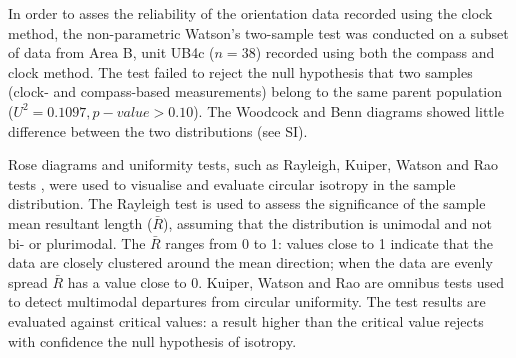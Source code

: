 \documentclass[preprint,authoryear,times]{elsarticle} %
\begin{document}
In order to asses the reliability of the orientation data recorded using the clock method, the non-parametric Watson's two-sample test was conducted on a subset of data from Area B, unit UB4c ($n=38$) recorded using both the compass and clock method. The test failed to reject the null hypothesis that two samples (clock- and compass-based measurements) belong to the same parent population ($U^2=0.1097, p-value>0.10$). The Woodcock and Benn diagrams showed little difference between the two distributions (see SI).

\begin{table}[]
  \caption{List of sampled observations for the fabric analysis.}
  \label{tab:1}
  \vspace{0.1in}
\end{table}

Rose diagrams and uniformity tests, such as Rayleigh, Kuiper, Watson and Rao tests \citep{Jammalamadaka2001}, were used to visualise and evaluate circular isotropy in the sample distribution. The Rayleigh test is used to assess the significance of the sample mean resultant length ($\bar{R}$), assuming that the distribution is unimodal and not bi- or plurimodal. The $\bar{R}$ ranges from 0 to 1: values close to 1 indicate that the data are closely clustered around the mean direction; when the data are evenly spread $\bar{R}$ has a value close to 0. %
Kuiper, Watson and Rao are omnibus tests used to detect multimodal departures from circular uniformity. %
The test results are evaluated against critical values: a result higher than the critical value rejects with confidence the null hypothesis of isotropy.%
\end{document}
